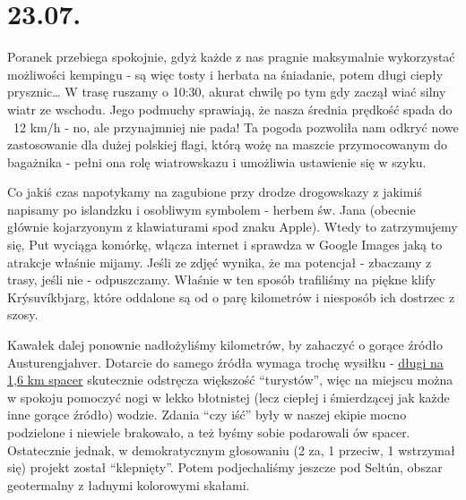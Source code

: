 \chapter*{23.07.}

Poranek przebiega spokojnie, gdyż każde z nas pragnie maksymalnie wykorzystać możliwości kempingu - są więc tosty i herbata na śniadanie, potem długi ciepły prysznic… W trasę ruszamy o 10:30, akurat chwilę po tym gdy zaczął wiać silny wiatr ze wschodu. Jego podmuchy sprawiają, że nasza średnia prędkość spada do ~12 km/h - no, ale przynajmniej nie pada! Ta pogoda pozwoliła nam odkryć nowe zastosowanie dla dużej polskiej flagi, którą wożę na maszcie przymocowanym do bagażnika - pełni ona rolę wiatrowskazu i umożliwia ustawienie się w szyku.


Co jakiś czas napotykamy na zagubione przy drodze drogowskazy z jakimiś napisamy po islandzku i osobliwym symbolem - herbem św. Jana (obecnie głównie kojarzyonym z klawiaturami spod znaku Apple). Wtedy to zatrzymujemy się, Put wyciąga komórkę, włącza internet i sprawdza w Google Images jaką to atrakcje właśnie mijamy. Jeśli ze zdjęć wynika, że ma potencjał - zbaczamy z trasy, jeśli nie - odpuszczamy. Właśnie w ten sposób trafiliśmy na piękne klify Krýsuvíkbjarg, które oddalone są od  o parę kilometrów i niesposób ich dostrzec z szosy.


Kawałek dalej ponownie nadłożyliśmy kilometrów, by zahaczyć o gorące źródło Austurengjahver. Dotarcie do samego źródła wymaga trochę wysiłku - \href{http://www.openstreetmap.org/way/33182596}{długi na 1,6 km spacer} skutecznie odstręcza większość “turystów”, więc na miejscu można w spokoju pomoczyć nogi w lekko błotnistej (lecz ciepłej i śmierdzącej jak każde inne gorące źródło) wodzie. Zdania “czy iść” były w naszej ekipie mocno podzielone i niewiele brakowało, a też byśmy sobie podarowali ów spacer. Ostatecznie jednak, w demokratycznym głosowaniu (2 za, 1 przeciw, 1 wstrzymał się) projekt został “klepnięty”. Potem podjechaliśmy jeszcze pod Seltún, obszar geotermalny z ładnymi kolorowymi skałami.

